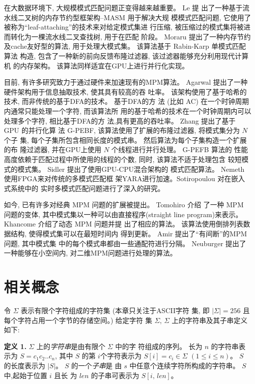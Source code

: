 在大数据环境下, 大规模模式匹配问题正变得越来越重要。 Le \cite{Le2013}提
出了一种基于流水线二叉树的内存节约型框架构--\textsf{MASM} 用于解决大规
模模式匹配问题, 它使用了被称为“leaf-attaching”的技术来对给定模式集进
行压缩, 被压缩过的模式集将被进而转化为一棵流水线二叉查找树, 用于在匹配
阶段。 Moraru \cite{Moraru2012} 提出了一种内存节约及cache友好型的算法,
用于处理大模式集。 该算法基于 Rabin-Karp \cite{Karp1987} 单模式匹配算法
构造, 包含了一种新的前向反馈布隆过滤器, 该过滤器能够充分利用现代计算机
的内存架构。 该算法同样适宜在GPU上进行并行化实现。

目前, 有许多研究致力于通过硬件来加速现有的MPM算法。 Agarwal
\cite{Agarwal2013} 提出了一种硬件架构用于信息抽取技术, 使其具有较高的吞
吐率。 该架构使用了基于哈希的技术, 而非传统的基于DFA的技术。 基于DFA的方
法 (比如 \textsf{AC}) 在一个时钟周期内通常只能处理一个字符, 而该算法所
用的基于哈希的技术在一个时钟周期内可以处理多个字符, 相比基于DFA的方
法,具有更高的吞吐率。 Zhang \cite{Zhang2015} 提出了基于 GPU 的并行化算
法 \textsf{G-PEBF}, 该算法使用了扩展的布隆过滤器, 将模式集分为 $N$ 个子
集, 每个子集所包含相同长度的模式串。 然后算法为每个子集构造一个扩展的布
隆过滤器, 并在GPU上使用 $N$ 个线程进行并行处理。 \textsf{G-PEFB} 算法的
性能高度依赖于匹配过程中所使用的线程的个数, 同时, 该算法不适于处理包含
较短模式的模式集。 Sidler \cite{Sidler2017} 提出了使用GPU-CPU混合架构的
模式匹配算法。 Nemeth \cite{Nemeth2016} 使用FPGA来对传统的多模式匹配框
架YARA进行加速。Sotiropoulou \cite{Sotiropoulou2017} 对在嵌入式系统中的
实时多模式匹配问题进行了深入的研究。

如今, 已有许多对经典 MPM 问题的扩展被提出。 Tomohiro \cite{I2015} 介绍
了一种 MPM 问题的变体, 其中模式集以一种可以由直接程序(straight line
program)来表示。  Khancome \cite{Khancome2013} 介绍了动态 MPM 问题并提
出了相应的算法。 该算法使用倒排列表数据结构, 使得模式集可以在最短时间内
得到更新。 Amir \cite{Amir2015} 提出了“有间断”的MPM 问题, 其中模式集
中的每个模式串都由一些通配符进行分隔。 Neuburger \cite{Neuburger2012}
提出了一种能够在小空间内, 对二维MPM问题进行处理的算法。

\section{相关概念}
\label{sec:2_notations}

令 $\Sigma$ 表示有限个字符组成的字符集 (本章只关注于ASCII字符
集, 即 $|\Sigma| = 256$ 且每个字符占用一个字节的存储空间。)  给定字符
集 $\Sigma$, $\Sigma$ 上的字符串及其子串定义如下:

\textbf{定义 1.}  $\Sigma$ 上的\emph{字符串}是由有限个 $\Sigma$ 中的字
符组成的序列。 长为 $n$ 的字符串表示为 $S =
c_1c_2..c_n$, 其中 $S$ 的第 $i$个字符表示为 $S[i] = c_i \in \Sigma$
$(1 \leq i \leq n)$。  $S$ 的长度表示为 $|S|$。 $S$ 的一个\emph{子串}是
由 $s$ 中任意个连续字符所构成的字符串。  $S$中,起始于位置 $i$ 且长
为 $len$ 的子串可表示为 $S[i,\,len]$。

